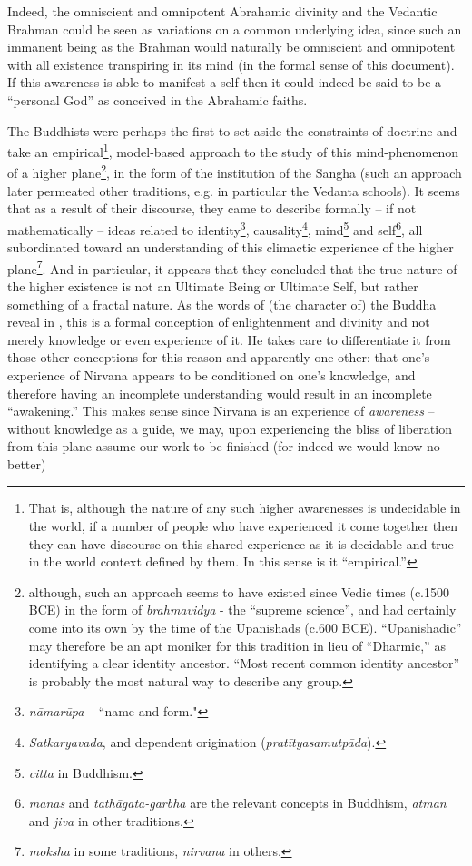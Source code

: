 \documentclass[pra,twocolumn,groupedaddress,10pt]{revtex4}
\theoremstyle{definition}
\begin{document}
Indeed, the omniscient and omnipotent Abrahamic divinity and the Vedantic Brahman could be seen as variations on a common underlying idea, since such an immanent being as the Brahman would naturally be omniscient and omnipotent with all existence transpiring in its mind (in the formal sense of this document). If this awareness is able to manifest a self then it could indeed be said to be a ``personal God'' as conceived in the Abrahamic faiths.

The Buddhists were perhaps the first to set aside the constraints of doctrine and take an empirical\footnote{That is, although the nature of any such higher awarenesses is undecidable in the world, if a number of people who have experienced it come together then they can have discourse on this shared experience as it is decidable and true in the world context defined by them. In this sense is it ``empirical.''}, model-based approach to the study of this mind-phenomenon of a higher plane\footnote{although, such an approach seems to have existed since Vedic times (c.1500 BCE) in the form of \textit{brahmavidya} - the ``supreme science''\cite{gita}, and had certainly come into its own by the time of the Upanishads (c.600 BCE). ``Upanishadic'' may therefore be an apt moniker for this tradition in lieu of ``Dharmic,'' as identifying a clear identity ancestor. ``Most recent common identity ancestor'' is probably the most natural way to describe any group.}, in the form of the institution of the Sangha (such an approach later permeated other traditions, e.g. in particular the Vedanta schools). It seems that as a result of their discourse, they came to describe formally -- if not mathematically -- ideas related to identity\footnote{\textit{n\={a}mar\={u}pa} -- ``name and form."}, causality\footnote{\textit{Satkaryavada}, and dependent origination (\textit{prat\={i}tyasamutp\={a}da}).}, mind\footnote{\textit{citta} in Buddhism.} and self\footnote{\textit{manas} and \textit{tath\={a}gata-garbha} are the relevant concepts in Buddhism, \textit{atman} and \textit{jiva} in other traditions.}, all subordinated toward an understanding of this climactic experience of the higher plane\footnote{\textit{moksha} in some traditions, \textit{nirvana} in others.}. And in particular, it appears that they concluded that the true nature of the higher existence is not an Ultimate Being or Ultimate Self, but rather something of a fractal nature. As the words of (the character of) the Buddha reveal in \cite{lankavatara}, this is a formal conception of enlightenment and divinity and not merely knowledge or even experience of it. He takes care to differentiate it from those other conceptions for this reason and apparently one other: that one's experience of Nirvana appears to be conditioned on one's knowledge, and therefore having an incomplete understanding would result in an incomplete ``awakening.'' This makes sense since Nirvana is an experience of \textit{awareness} -- without knowledge as a guide, we may, upon experiencing the bliss of liberation from this plane assume our work to be finished (for indeed we would know no better) 
\end{document}
